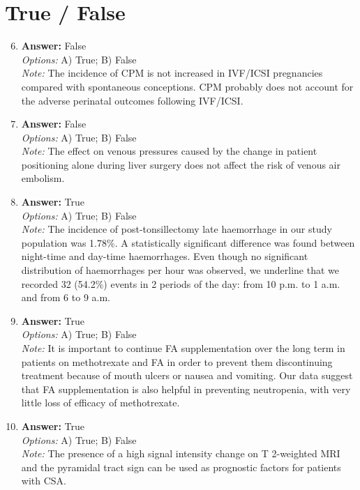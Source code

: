 \documentclass[12pt]{article}
\begin{document}
\section*{True / False}
\begin{enumerate}[label=\arabic*.]
\setcounter{enumi}{5}
\item \textbf{Answer:} False
\\ \textit{Options:} A) True; B) False
\\ \textit{Note:} The incidence of CPM is not increased in IVF/ICSI pregnancies compared with spontaneous conceptions. CPM probably does not account for the adverse perinatal outcomes following IVF/ICSI.
\item \textbf{Answer:} False
\\ \textit{Options:} A) True; B) False
\\ \textit{Note:} The effect on venous pressures caused by the change in patient positioning alone during liver surgery does not affect the risk of venous air embolism.
\item \textbf{Answer:} True
\\ \textit{Options:} A) True; B) False
\\ \textit{Note:} The incidence of post-tonsillectomy late haemorrhage in our study population was 1.78\%. A statistically significant difference was found between night-time and day-time haemorrhages. Even though no significant distribution of haemorrhages per hour was observed, we underline that we recorded 32 (54.2\%) events in 2 periods of the day: from 10 p.m. to 1 a.m. and from 6 to 9 a.m.
\item \textbf{Answer:} True
\\ \textit{Options:} A) True; B) False
\\ \textit{Note:} It is important to continue FA supplementation over the long term in patients on methotrexate and FA in order to prevent them discontinuing treatment because of mouth ulcers or nausea and vomiting. Our data suggest that FA supplementation is also helpful in preventing neutropenia, with very little loss of efficacy of methotrexate.
\item \textbf{Answer:} True
\\ \textit{Options:} A) True; B) False
\\ \textit{Note:} The presence of a high signal intensity change on T 2-weighted MRI and the pyramidal tract sign can be used as prognostic factors for patients with CSA.
\end{enumerate}
\end{document}
